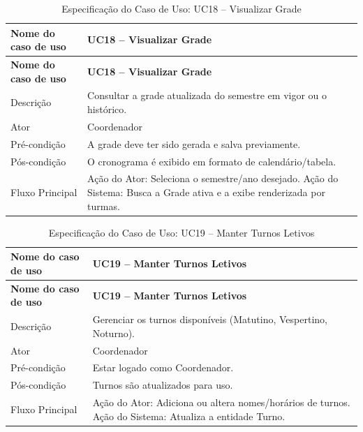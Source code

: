 \fonteautores

\vspace{\baselineskip}

\Needspace{0.48\textheight}
\begin{longtable}{|L{4.5cm}|L{10.5cm}|}
\caption{Especificação do Caso de Uso: UC18 -- Visualizar Grade} \\
\hline
\textbf{Nome do caso de uso} & \textbf{UC18 -- Visualizar Grade} \\
\hline
\endfirsthead
\hline
\textbf{Nome do caso de uso} & \textbf{UC18 -- Visualizar Grade} \\
\hline
\endhead
Descrição       & Consultar a grade atualizada do semestre em vigor ou o histórico. \\
\hline
Ator            & Coordenador \\
\hline
Pré-condição    & A grade deve ter sido gerada e salva previamente. \\
\hline
Pós-condição    & O cronograma é exibido em formato de calendário/tabela. \\
\hline
Fluxo Principal & Ação do Ator: Seleciona o semestre/ano desejado. Ação do Sistema: Busca a Grade ativa e a exibe renderizada por turmas. \\
\hline
\end{longtable}

\fonteautores

\vspace{\baselineskip}

\Needspace{0.48\textheight}
\begin{longtable}{|L{4.5cm}|L{10.5cm}|}
\caption{Especificação do Caso de Uso: UC19 -- Manter Turnos Letivos} \\
\hline
\textbf{Nome do caso de uso} & \textbf{UC19 -- Manter Turnos Letivos} \\
\hline
\endfirsthead
\hline
\textbf{Nome do caso de uso} & \textbf{UC19 -- Manter Turnos Letivos} \\
\hline
\endhead
Descrição       & Gerenciar os turnos disponíveis (Matutino, Vespertino, Noturno). \\
\hline
Ator            & Coordenador \\
\hline
Pré-condição    & Estar logado como Coordenador. \\
\hline
Pós-condição    & Turnos são atualizados para uso. \\
\hline
Fluxo Principal & Ação do Ator: Adiciona ou altera nomes/horários de turnos. Ação do Sistema: Atualiza a entidade Turno. \\
\hline
\end{longtable}

